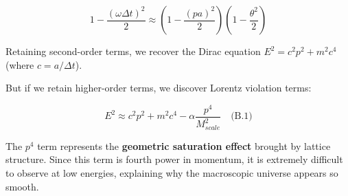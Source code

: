 $$1 - \frac{(\omega \Delta t)^2}{2} \approx (1 - \frac{(pa)^2}{2})(1 - \frac{\theta^2}{2})$$

Retaining second-order terms, we recover the Dirac equation $E^2 = c^2 p^2 + m^2 c^4$ (where $c = a/\Delta t$).

But if we retain higher-order terms, we discover Lorentz violation terms:

$$E^2 \approx c^2 p^2 + m^2 c^4 - \alpha \frac{p^4}{M_{scale}^2} \quad \text{(B.1)}$$

The $p^4$ term represents the \textbf{geometric saturation effect} brought by lattice structure. Since this term is fourth power in momentum, it is extremely difficult to observe at low energies, explaining why the macroscopic universe appears so smooth.

